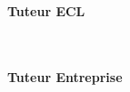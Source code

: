 \documentclass[../main/main.tex]{subfiles}
\begin{document}
\begin{titlepage}
    \begin{minipage}{0.4\textwidth}
        \begin{flushleft}
            \textbf{Tuteur ECL}\\
            {\scshape \schoolTutorLastName{}}~\textit{\schoolTutorFirstName{}}\\
            \href{mailto:\schoolTutorEmail}{\schoolTutorEmail}\\
        \end{flushleft}
    \end{minipage}
    \hfill
    \begin{minipage}{0.4\textwidth}
        \begin{flushright}
            \textbf{Tuteur Entreprise}\\
            {\scshape \companyTutorLastName{}}~\textit{\companyTutorFirstName{}}\\
            \href{mailto:\companyTutorEmail}{\companyTutorEmail}\\
        \end{flushright}
    \end{minipage}
\end{titlepage}

\hypersetup{pageanchor=true}
\restoregeometry{}

\thispagestyle{empty}\cleardoublepage{}
\end{document}
